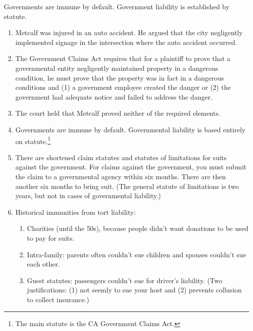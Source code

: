 Governments are immune by default. Government liability is established by 
statute.

\begin{enumerate}
    \item Metcalf was injured in an auto accident. He argued that the city 
    negligently implemented signage in the intersection where the auto 
    accident occurred.
    \item The Government Claims Act requires that for a plaintiff to prove 
    that a governmental entity negligently maintained property in a dangerous 
    condition, he must prove that the property was in fact in a dangerous 
    conditions and (1) a government employee created the danger or (2) the 
    government had adequate notice and failed to address the danger.
    \item The court held that Metcalf proved neither of the required elements.
    \item Governments are immune by default. Governmental liability is based 
    entirely on statute.\footnote{The main statute is the CA Government Claims 
    Act.}
    \item There are shortened claim statutes and statutes of limitations for 
    suits against the government. For claims against the government, you must 
    submit the claim to a governmental agency within six months. There are 
    then another six months to bring suit. (The general statute of limitations 
    is two years, but not in cases of governmental liability.)
    \item Historical immunities from tort liability:
    \begin{enumerate}
        \item Charities (until the 50s), because people didn't want donations 
        to be used to pay for suits.
        \item Intra-family: parents often couldn't sue children and spouses 
        couldn't sue each other.
        \item Guest statutes: passengers couldn't sue for driver's liability.  
        (Two justifications: (1) not seemly to sue your host and (2) prevents 
        collusion to collect insurance.)
    \end{enumerate}
\end{enumerate}
